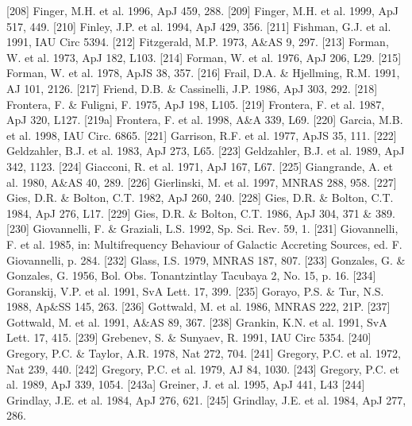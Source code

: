 \documentclass{aa}
\begin{document}
\begin{thebibliography}{}
\bibitem[]{}[208] Finger, M.H. et al. 1996, ApJ 459, 288.
\bibitem[]{}[209] Finger, M.H. et al. 1999, ApJ 517, 449.
\bibitem[]{}[210] Finley, J.P. et al. 1994, ApJ 429, 356.
\bibitem[]{}[211] Fishman, G.J. et al. 1991, IAU Circ 5394.
\bibitem[]{}[212] Fitzgerald, M.P. 1973, A\&AS 9, 297.
\bibitem[]{}[213] Forman, W. et al. 1973, ApJ 182, L103.
\bibitem[]{}[214] Forman, W. et al. 1976, ApJ 206, L29.
\bibitem[]{}[215] Forman, W. et al. 1978, ApJS 38, 357.
\bibitem[]{}[216] Frail, D.A. \& Hjellming, R.M. 1991, AJ 101, 2126.
\bibitem[]{}[217] Friend, D.B. \& Cassinelli, J.P. 1986, ApJ 303, 292.
\bibitem[]{}[218] Frontera, F. \& Fuligni, F. 1975, ApJ 198, L105.
\bibitem[]{}[219] Frontera, F. et al. 1987, ApJ 320, L127.
\bibitem[]{}[219a] Frontera, F. et al. 1998, A\&A 339, L69.
\bibitem[]{}[220] Garcia, M.B. et al. 1998, IAU Circ. 6865.
\bibitem[]{}[221] Garrison, R.F. et al. 1977, ApJS 35, 111.
\bibitem[]{}[222] Geldzahler, B.J. et al. 1983, ApJ 273, L65.
\bibitem[]{}[223] Geldzahler, B.J. et al. 1989, ApJ 342, 1123.
\bibitem[]{}[224] Giacconi, R. et al. 1971, ApJ 167, L67.
\bibitem[]{}[225] Giangrande, A. et al. 1980, A\&AS 40, 289.
\bibitem[]{}[226] Gierlinski, M. et al. 1997, MNRAS 288, 958.
\bibitem[]{}[227] Gies, D.R. \& Bolton, C.T. 1982, ApJ 260, 240.
\bibitem[]{}[228] Gies, D.R. \& Bolton, C.T. 1984, ApJ 276, L17.
\bibitem[]{}[229] Gies, D.R. \& Bolton, C.T. 1986, ApJ 304, 371 \& 389.
\bibitem[]{}[230] Giovannelli, F. \& Graziali, L.S. 1992, Sp. Sci. Rev. 59, 1.
\bibitem[]{}[231] Giovannelli, F. et al. 1985, in: Multifrequency Behaviour of Galactic 
                     Accreting Sources, ed. F. Giovannelli, p. 284.
\bibitem[]{}[232] Glass, I.S. 1979, MNRAS 187, 807.
\bibitem[]{}[233] Gonzales, G. \& Gonzales, G. 1956, Bol. Obs. Tonantzintlay Tacubaya 2, No. 15, p. 16.
\bibitem[]{}[234] Goranskij, V.P. et al. 1991, SvA Lett. 17, 399.
\bibitem[]{}[235] Gorayo, P.S. \& Tur, N.S. 1988, Ap\&SS 145, 263.
\bibitem[]{}[236] Gottwald, M. et al. 1986, MNRAS 222, 21P.
\bibitem[]{}[237] Gottwald, M. et al. 1991, A\&AS 89, 367.
\bibitem[]{}[238] Grankin, K.N. et al. 1991, SvA Lett. 17, 415.
\bibitem[]{}[239] Grebenev, S. \& Sunyaev, R. 1991, IAU Circ 5354.
\bibitem[]{}[240] Gregory, P.C. \& Taylor, A.R. 1978, Nat 272, 704.
\bibitem[]{}[241] Gregory, P.C. et al. 1972, Nat 239, 440.
\bibitem[]{}[242] Gregory, P.C. et al. 1979, AJ 84, 1030.
\bibitem[]{}[243] Gregory, P.C. et al. 1989, ApJ 339, 1054.
\bibitem[]{}[243a] Greiner, J. et al. 1995, ApJ 441, L43
\bibitem[]{}[244] Grindlay, J.E. et al. 1984, ApJ 276, 621.
\bibitem[]{}[245] Grindlay, J.E. et al. 1984, ApJ 277, 286.

\end{thebibliography}
\end{document}
